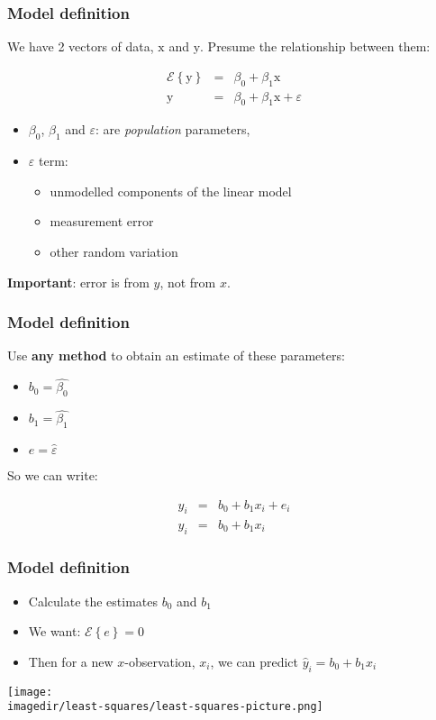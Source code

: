 \begin{frame}\frametitle{Model definition}

	We have 2 vectors of data, $\mathrm{x}$ and $\mathrm{y}$. Presume the relationship between them:

	$$
	\begin{array}{rcl}
		\mathcal{E}\left\{\mathrm{y}\right\} &=& \beta_0 + \beta_1 \mathrm{x} \\
		\mathrm{y} &=& \beta_0 + \beta_1 \mathrm{x} + \varepsilon
	\end{array}
	$$
	\begin{itemize}
		\item	$\beta_0$, $\beta_1$ and $\varepsilon$: are \emph{population} parameters,
		\item	$\varepsilon$ term:
		\begin{itemize}
			\item	unmodelled components of the linear model
			\item	measurement error
			\item	other random variation
		\end{itemize}
	\end{itemize}

	\textbf{Important}: error is from $y$, not from $x$.
\end{frame}

\begin{frame}\frametitle{Model definition}

	Use \textbf{any method} to obtain an estimate of these parameters:
	\begin{itemize}
		\item	$b_0 = \hat{\beta_0}$
		\item	$b_1 = \hat{\beta_1}$
		\item	$e = \hat{\varepsilon}$
	\end{itemize}

	So we can write:

	$$
	\begin{array}{rcl}
		y_i &=& b_0 + b_1 x_i + e_i \\
		\hat{y}_i &=& b_0 + b_1 x_i
	\end{array}
	$$
\end{frame}

\begin{frame}\frametitle{Model definition}
	\begin{itemize}
		\item	Calculate the estimates $b_0$ and $b_1$
		\item	We want: $\mathcal{E}\left\{e\right\} = 0$
		\item	Then for a new $x$-observation, $x_i$, we can predict $\hat{y}_i =b_0 + b_1x_{i}$
	\end{itemize}
	\begin{center}
		\texttt{[image: \\imagedir/least-squares/least-squares-picture.png]}
	\end{center}
\end{frame}

